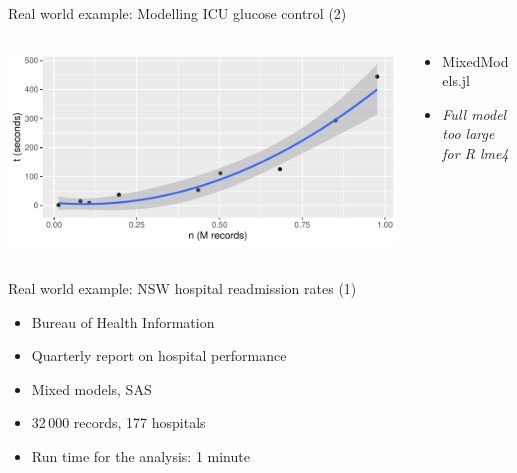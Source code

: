 \documentclass[aspectratio=169,12pt,usepdftitle=false]{beamer} %
\begin{document}
\begin{frame}{Real world example: Modelling ICU glucose control (2)}
\begin{columns}
    \begin{column}{0.65\textwidth}
    \centering
    \includegraphics[height=0.8\textheight]
	    {ref/oisin.pdf}
    \end{column}
    \begin{column}{0.35\textwidth}
	\begin{itemize}
	    \item MixedModels.jl
	    \item \emph{Full model too large for R lme4}
	\end{itemize}
    \end{column}
\end{columns}
\end{frame}

\begin{frame}{Real world example: NSW hospital readmission rates (1)}
    \begin{itemize}
	\item Bureau of Health Information
	\item Quarterly report on hospital performance
	\item Mixed models, SAS
	\item 32\,000 records, 177 hospitals
	\item Run time for the analysis: 1 minute
    \end{itemize}
\end{frame}
\end{document}
